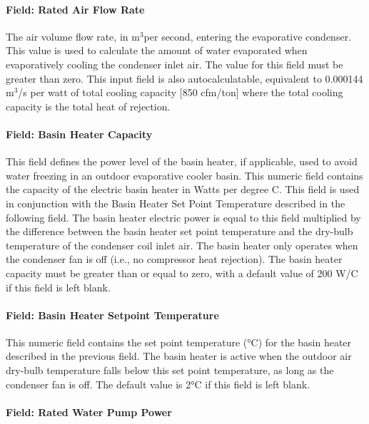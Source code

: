 \paragraph{Field: Rated Air Flow Rate}\label{field-rated-air-flow-rate-000}

The air volume flow rate, in m\(^{3}\)per second, entering the evaporative condenser. This value is used to calculate the amount of water evaporated when evaporatively cooling the condenser inlet air. The value for this field must be greater than zero. This input field is also autocalculatable, equivalent to 0.000144 m\(^{3}\)/s per watt of total cooling capacity {[}850 cfm/ton{]} where the total cooling capacity is the total heat of rejection.

\paragraph{Field: Basin Heater Capacity}\label{field-basin-heater-capacity-1-002}

This field defines the power level of the basin heater, if applicable, used to avoid water freezing in an outdoor evaporative cooler basin. This numeric field contains the capacity of the electric basin heater in Watts per degree C. This field is used in conjunction with the Basin Heater Set Point Temperature described in the following field. The basin heater electric power is equal to this field multiplied by the difference between the basin heater set point temperature and the dry-bulb temperature of the condenser coil inlet air. The basin heater only operates when the condenser fan is off (i.e., no compressor heat rejection). The basin heater capacity must be greater than or equal to zero, with a default value of 200 W/C if this field is left blank.

\paragraph{Field: Basin Heater Setpoint Temperature}\label{field-basin-heater-setpoint-temperature-1-002}

This numeric field contains the set point temperature (°C) for the basin heater described in the previous field. The basin heater is active when the outdoor air dry-bulb temperature falls below this set point temperature, as long as the condenser fan is off. The default value is 2°C if this field is left blank.

\paragraph{Field: Rated Water Pump Power}\label{field-rated-water-pump-power}

